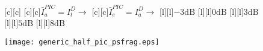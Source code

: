 \documentclass{article}
\begin{document}
\begin{figure}[htb]
  \begin{center}

        [c][c]{}
        [c][c]{$\bar{I}_{a}^{PIC}=I_{t}^D \rightarrow$}
        [c][c]{$\bar{I}_{e}^{PIC}=I_{a}^D \rightarrow$}
        [l][l]{$\mathrm{-3dB}$}
        [l][l]{$\mathrm{0dB}$}
	[l]{$\mathrm{3dB}$}
	[l]{$\mathrm{5dB}$}
        [l][l]{$\mathrm{8dB}$}       

    \texttt{[image: generic\_half\_pic\_psfrag.eps]}
    \end{center}
\end{figure}
\end{document}
